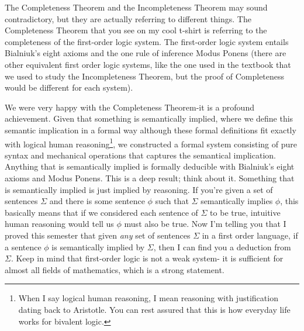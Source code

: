 \documentclass[11pt]{hmcpset}
\newenvironment{problem1}[1]{\noindent {\bf Problem #1}}
{\medskip}
\begin{document}
\begin{problem1}{5}
\indent The Completeness Theorem and the Incompleteness Theorem may sound contradictory, but they are actually referring to different things. The Completeness Theorem that you see on my cool t-shirt is referring to the completeness of the first-order logic system. The first-order logic system entails Bialniuk's eight axioms and the one rule of inference Modus Ponens (there are other equivalent first order logic systems, like the one used in the textbook that we used to study the Incompleteness Theorem, but the proof of Completeness would be different for each system).

We were very happy with the Completeness Theorem-it is a profound achievement. Given that something is semantically implied, where we define this semantic implication in a formal way although these formal definitions fit exactly with logical human reasoning\footnote{When I say logical human reasoning, I mean reasoning with justification dating back to Aristotle. You can rest assured that this is how everyday life works for bivalent logic.}, we constructed a formal system consisting of pure syntax and mechanical operations that captures the semantical implication. Anything that is semantically implied is formally deducible with Bialniuk's eight axioms and Modus Ponens. This is a deep result; think about it. Something that is semantically implied is just implied by reasoning. If you're given a set of sentences $\Sigma$ and there is some sentence $\phi$ such that $\Sigma$ semantically implies $\phi$, this basically means that if we considered each sentence of $\Sigma$ to be true, intuitive human reasoning would tell us $\phi$ must also be true. Now I'm telling you that I proved this semester that given \emph{any} set of sentences $\Sigma$ in a first order language, if a sentence $\phi$ is semantically implied by $\Sigma$, then I can find you a deduction from $\Sigma$. Keep in mind that first-order logic is not a weak system- it is sufficient for almost all fields of mathematics, which is a strong statement.


\end{problem1}
\end{document}
